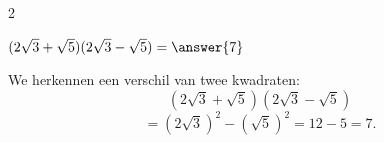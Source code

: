 \documentclass{ximera}
\begin{document}
\begin{oefening}[Wortels]{\oefB\ESS}
\begin{multicols}{2}
        
        \begin{question}
        $(2\sqrt3+\sqrt5)(2\sqrt3-\sqrt5)
        =\answer{7}$
        
        \begin{oplossing}
        We herkennen een verschil van twee kwadraten:
        \[
        (2\sqrt3+\sqrt5)(2\sqrt3-\sqrt5)
        \]
        \[
        =(2\sqrt3)^2-(\sqrt5)^2
        =12-5
        =7.
        \]
        \end{oplossing}
        \end{question}
        
        \end{multicols}
        
        \end{oefening}
\end{document}
